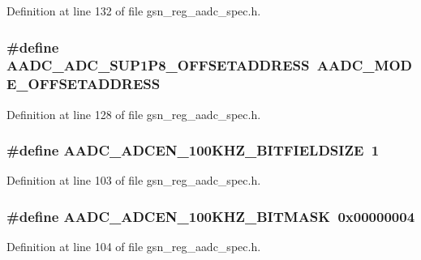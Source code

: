 Definition at line 132 of file gsn\_\-reg\_\-aadc\_\-spec.h.

\hypertarget{a00543_acceddef4fee060990c3311823af78d73}{
\subsubsection[{AADC\_\-ADC\_\-SUP1P8\_\-OFFSETADDRESS}]{\setlength{\rightskip}{0pt plus 5cm}\#define AADC\_\-ADC\_\-SUP1P8\_\-OFFSETADDRESS~AADC\_\-MODE\_\-OFFSETADDRESS}}
\label{a00543_acceddef4fee060990c3311823af78d73}


Definition at line 128 of file gsn\_\-reg\_\-aadc\_\-spec.h.

\hypertarget{a00543_acccacd2d97dcf55aebba36a09bf3fe1f}{
\subsubsection[{AADC\_\-ADCEN\_\-100KHZ\_\-BITFIELDSIZE}]{\setlength{\rightskip}{0pt plus 5cm}\#define AADC\_\-ADCEN\_\-100KHZ\_\-BITFIELDSIZE~1}}
\label{a00543_acccacd2d97dcf55aebba36a09bf3fe1f}


Definition at line 103 of file gsn\_\-reg\_\-aadc\_\-spec.h.

\hypertarget{a00543_a6c48bdf57fed6d89bd387f4a1c3a87aa}{
\subsubsection[{AADC\_\-ADCEN\_\-100KHZ\_\-BITMASK}]{\setlength{\rightskip}{0pt plus 5cm}\#define AADC\_\-ADCEN\_\-100KHZ\_\-BITMASK~0x00000004}}
\label{a00543_a6c48bdf57fed6d89bd387f4a1c3a87aa}


Definition at line 104 of file gsn\_\-reg\_\-aadc\_\-spec.h.


